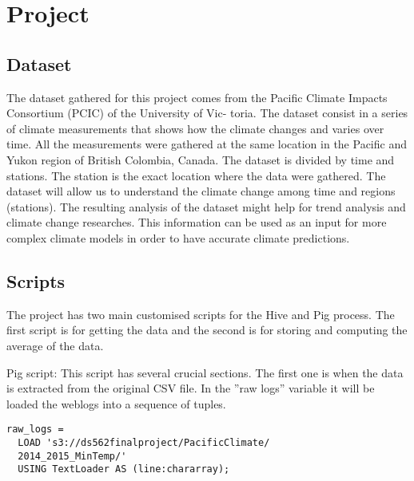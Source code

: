 
\section{Project}
\label{sec:Project}




\subsection{ Dataset}
The dataset gathered for this project comes from the Pacific Climate Impacts Consortium (PCIC) of the University of Vic- toria. The dataset consist in a series of climate measurements that shows how the climate changes and varies over time. All the measurements were gathered at the same location in the Pacific and Yukon region of British Colombia, Canada. The dataset is divided by time and stations. The station is the exact location where the data were gathered. The dataset will allow us to understand the climate change among time and regions (stations). The resulting analysis of the dataset might help for trend analysis and climate change researches. This information can be used as an input for more complex climate models in order to have accurate climate predictions.


\subsection{Scripts}
The project has two main customised scripts for the Hive and Pig process. The first script is for getting the data and the second is for storing and computing the average of the data.

Pig script: This script has several crucial sections. The first one is when the data is extracted from the original CSV file. In the ”raw logs” variable it will be loaded the weblogs into a sequence of tuples.

\begin{lstlisting}
raw_logs =
  LOAD 's3://ds562finalproject/PacificClimate/
  2014_2015_MinTemp/' 
  USING TextLoader AS (line:chararray);
\end{lstlisting}

